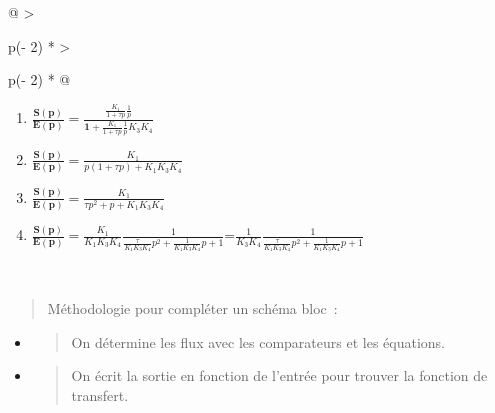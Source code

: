 \begin{longtable}[]{@{}
  >{\raggedright\arraybackslash}p{(\columnwidth - 2\tabcolsep) * }
  >{\raggedright\arraybackslash}p{(\columnwidth - 2\tabcolsep) * }@{}}
\begin{minipage}[b]{\linewidth}
\begin{enumerate}
\def\labelenumi{\arabic{enumi}.}
\item
  \(\frac{\mathbf{S}\left( \mathbf{p} \right)}{\mathbf{E}\left( \mathbf{p} \right)} = \frac{\frac{K_{1}}{1 + \tau p}\frac{1}{p}}{\mathbf{1} + \frac{K_{1}}{1 + \tau p}\frac{1}{p}K_{3}K_{4}}\)
\item
  \(\frac{\mathbf{S}\left( \mathbf{p} \right)}{\mathbf{E}\left( \mathbf{p} \right)} = \frac{K_{1}}{p(1 + \tau p) + K_{1}K_{3}K_{4}}\)
\item
  \(\frac{\mathbf{S}\left( \mathbf{p} \right)}{\mathbf{E}\left( \mathbf{p} \right)} = \frac{K_{1}}{\tau p^{2} + p + K_{1}K_{3}K_{4}}\)
\item
  \(\frac{\mathbf{S}\left( \mathbf{p} \right)}{\mathbf{E}\left( \mathbf{p} \right)} = \frac{K_{1}}{K_{1}K_{3}K_{4}}\frac{1}{\frac{\tau}{K_{1}K_{3}K_{4}}p^{2} + \frac{1}{K_{1}K_{3}K_{4}}p + 1}\)=\(\frac{1}{K_{3}K_{4}}\frac{1}{\frac{\tau}{K_{1}K_{3}K_{4}}p^{2} + \frac{1}{K_{1}K_{3}K_{4}}p + 1}\)
\end{enumerate}
\end{minipage} \\
\midrule\noalign{}
\endhead
\bottomrule\noalign{}
\endlastfoot
\end{longtable}

\begin{quote}
Méthodologie pour compléter un schéma bloc~:
\end{quote}

\begin{itemize}
\item
  \begin{quote}
  On détermine les flux avec les comparateurs et les équations.
  \end{quote}
\item
  \begin{quote}
  On écrit la sortie en fonction de l'entrée pour trouver la fonction de transfert.
  \end{quote}
\end{itemize}

